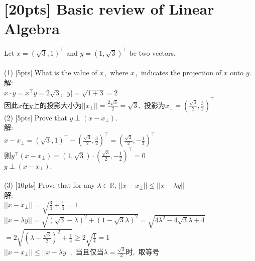 \documentclass{article}
\begin{document}
	\section{[20pts] Basic review of Linear Algebra}
	Let $x = (\sqrt{3}, 1)^{\top}$ and $y = (1, \sqrt{3})^{\top}$ be two vectors,\\\\
	(1) [5pts] What is the value of $x_{\perp}$ where $x_{\perp}$ indicates the projection of $x$ onto $y$. \\
解:\\
\indent $x\cdot y=x^{\top}y=2\sqrt{3}$, $|y|=\sqrt{1+3}=2$\\
\indent 因此$x$在$y$上的投影大小为$||x_{\perp}||=\frac{2\sqrt3}{2}=\sqrt{3},$ 投影为$x_{\perp}=(\frac{\sqrt3}{2},\frac{3}{2})^{\top}$
\\
	(2) [5pts] Prove that $y \perp (x - x_{\perp})$.\\
解:\\
\indent $x-x_{\perp}=(\sqrt3,1)^{\top}-(\frac{\sqrt3}{2},\frac{3}{2})^{\top}=(\frac{\sqrt3}{2},-\frac{1}{2})^{\top}$\\
\indent 则$y^{\top}(x-x_\perp)=(1,\sqrt3)\cdot(\frac{\sqrt3}{2},-\frac{1}{2})^{\top}=0$\\
 $y\perp(x-x_\perp).$\\
\\
	(3) [10pts] Prove that for any $\lambda \in \mathbb{R}$, $\lvert| x - x_{\perp}\rvert| \leq \lvert| x - \lambda y \rvert|$ \\
解:\\
$\lvert|x-x_\perp\rvert|=\sqrt{\frac{3}{4}+\frac{1}{4}}=1$\\
$\lvert|x-\lambda y\rvert|=\sqrt{(\sqrt3-\lambda)^2+(1-\sqrt3\lambda)^2}=\sqrt{4\lambda^2-4\sqrt3\lambda+4}$\\
\indent$=2\sqrt{(\lambda-\frac{\sqrt3}{2})^2+\frac{1}{4}}\geq 2\sqrt{\frac{1}{4}}=1$\\
$\lvert| x - x_{\perp}\rvert| \leq \lvert| x - \lambda y \rvert|,$ 当且仅当$\lambda=\frac{\sqrt3}{2}时,$ 取等号 \\
	
\end{document}

